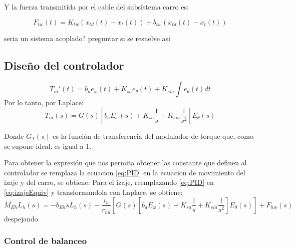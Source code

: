 \documentclass{article}
\begin{document}
            Y la fuerza transmitida por el cable del subsistema carro es:

            \begin{equation} \label{eq:fuerzaCableCarro}
                F_{tw}(t) = K_{tw}(x_{td}(t) - x_t(t)) + b_{tw}(\dot{x_{td}}(t) - \dot{x_t}(t))
            \end{equation}

            seria un sistema acoplado? preguntar si se resuelve asi

                
        \subsection{Diseño del controlador}

            \begin{equation}\label{eq:PID}
                T_m'(t) = b_ae_\omega(t) + K_{sa} e_\theta(t) + K_{sia}\int e_\theta(t) dt
            \end{equation}
            Por lo tanto, por Laplace:
            \begin{equation}\label{eq:PID_Laplace}
                T_m(s) = G(s)[b_aE_\omega(s) + K_{sa} \frac{1}{s} + K_{sia} \frac{1}{s^2}]E_\theta(s)
            \end{equation}

            Donde \(G_T(s)\) es la función de transferencia del modulador de torque que, como se supone ideal, es igual a 1.


            Para obtener la expresión que nos permita obtener las constante que definen al controlador se remplaza la ecuacion \ref{eq:PID} en la ecuacion de movimiento del izaje y del carro, se obtiene:
            Para el izaje, reemplazando \ref{eq:PID} en \ref{eq:izajeEquiv} y transformandola con Laplace, se obtiene:
            \begin{equation}\label{eq:izajeControl}
                M_{Eh} \ddot{L_h}(s) = - b_{Eh} sL_h(s) - \frac{i_h}{r_{hd}} [G(s)[b_aE_\omega(s) + K_{sa} \frac{1}{s} + K_{sia} \frac{1}{s^2}]E_\theta(s)] + F_{hw}(s)
            \end{equation}
            despejando 



        \subsubsection{Control de balanceo}
\end{document}
